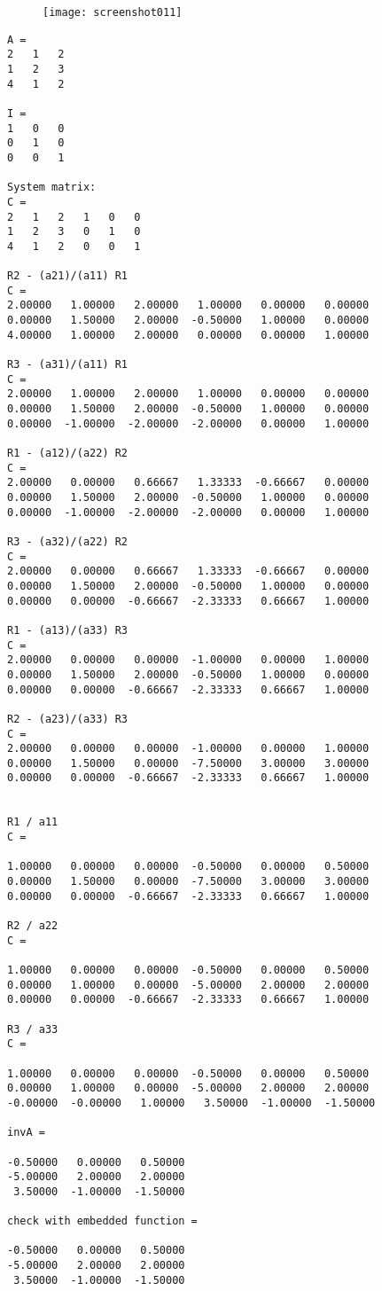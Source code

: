\documentclass[eng,openany]{mgr}
\begin{document}
\newpage
\begin{figure}[h]
\centering
\texttt{[image: screenshot011]}
\label{fig:screenshot011}
\end{figure}
\begin{lstlisting}
A =
2   1   2
1   2   3
4   1   2

I =
1   0   0
0   1   0
0   0   1

System matrix:
C =
2   1   2   1   0   0
1   2   3   0   1   0
4   1   2   0   0   1

R2 - (a21)/(a11) R1
C =
2.00000   1.00000   2.00000   1.00000   0.00000   0.00000
0.00000   1.50000   2.00000  -0.50000   1.00000   0.00000
4.00000   1.00000   2.00000   0.00000   0.00000   1.00000

R3 - (a31)/(a11) R1
C =
2.00000   1.00000   2.00000   1.00000   0.00000   0.00000
0.00000   1.50000   2.00000  -0.50000   1.00000   0.00000
0.00000  -1.00000  -2.00000  -2.00000   0.00000   1.00000

R1 - (a12)/(a22) R2
C =
2.00000   0.00000   0.66667   1.33333  -0.66667   0.00000
0.00000   1.50000   2.00000  -0.50000   1.00000   0.00000
0.00000  -1.00000  -2.00000  -2.00000   0.00000   1.00000

R3 - (a32)/(a22) R2
C =
2.00000   0.00000   0.66667   1.33333  -0.66667   0.00000
0.00000   1.50000   2.00000  -0.50000   1.00000   0.00000
0.00000   0.00000  -0.66667  -2.33333   0.66667   1.00000

R1 - (a13)/(a33) R3
C =
2.00000   0.00000   0.00000  -1.00000   0.00000   1.00000
0.00000   1.50000   2.00000  -0.50000   1.00000   0.00000
0.00000   0.00000  -0.66667  -2.33333   0.66667   1.00000

R2 - (a23)/(a33) R3
C =
2.00000   0.00000   0.00000  -1.00000   0.00000   1.00000
0.00000   1.50000   0.00000  -7.50000   3.00000   3.00000
0.00000   0.00000  -0.66667  -2.33333   0.66667   1.00000


R1 / a11
C =

1.00000   0.00000   0.00000  -0.50000   0.00000   0.50000
0.00000   1.50000   0.00000  -7.50000   3.00000   3.00000
0.00000   0.00000  -0.66667  -2.33333   0.66667   1.00000

R2 / a22
C =

1.00000   0.00000   0.00000  -0.50000   0.00000   0.50000
0.00000   1.00000   0.00000  -5.00000   2.00000   2.00000
0.00000   0.00000  -0.66667  -2.33333   0.66667   1.00000

R3 / a33
C =

1.00000   0.00000   0.00000  -0.50000   0.00000   0.50000
0.00000   1.00000   0.00000  -5.00000   2.00000   2.00000
-0.00000  -0.00000   1.00000   3.50000  -1.00000  -1.50000

invA =

-0.50000   0.00000   0.50000
-5.00000   2.00000   2.00000
 3.50000  -1.00000  -1.50000

check with embedded function =

-0.50000   0.00000   0.50000
-5.00000   2.00000   2.00000
 3.50000  -1.00000  -1.50000
\end{lstlisting}
\end{document}
